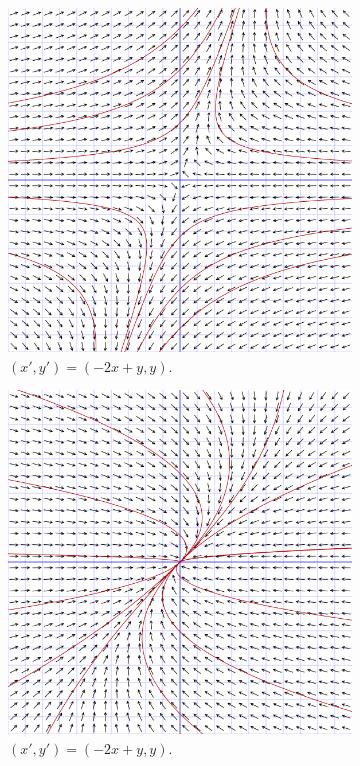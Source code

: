 \begin{enumerate}
\begin{figure}[H]
\begin{subfigure}{.45\textwidth}
      \includegraphics[width=.8\textwidth]{./images/fases-neg-pos.png}
      \caption{$(x', y') = (-2x +y, y)$.}
      \label{fig:fases:neg-pos}
    \end{subfigure}
    \begin{subfigure}{.45\textwidth}
      \centering
      \includegraphics[width=.8\textwidth]{./images/fases-neg-neg.png}
      \caption{$(x', y') = (-2x +y, y)$.}
      \label{fig:fases:neg-neg}
    \end{subfigure}
    \begin{subfigure}{.45\textwidth}
      \centering

\end{subfigure}
\end{figure}
\end{enumerate}
